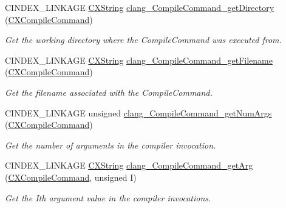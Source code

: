 \begin{DoxyCompactItemize}
\mbox{\label{group__COMPILATIONDB_gaa9bf6d3d4d19b8e32efc58cdc0fe53ad}} 
C\+I\+N\+D\+E\+X\+\_\+\+L\+I\+N\+K\+A\+GE \mbox{\hyperlink{structCXString}{C\+X\+String}} \mbox{\hyperlink{group__COMPILATIONDB_gaa9bf6d3d4d19b8e32efc58cdc0fe53ad}{clang\+\_\+\+Compile\+Command\+\_\+get\+Directory}} (\mbox{\hyperlink{group__COMPILATIONDB_gae59272595ab7fa4c1ed03348c56264bf}{C\+X\+Compile\+Command}})
\begin{DoxyCompactList}\small\item\em Get the working directory where the Compile\+Command was executed from. \end{DoxyCompactList}\item 
\mbox{\label{group__COMPILATIONDB_gaea64448378c6174e7896a81d26ff454a}} 
C\+I\+N\+D\+E\+X\+\_\+\+L\+I\+N\+K\+A\+GE \mbox{\hyperlink{structCXString}{C\+X\+String}} \mbox{\hyperlink{group__COMPILATIONDB_gaea64448378c6174e7896a81d26ff454a}{clang\+\_\+\+Compile\+Command\+\_\+get\+Filename}} (\mbox{\hyperlink{group__COMPILATIONDB_gae59272595ab7fa4c1ed03348c56264bf}{C\+X\+Compile\+Command}})
\begin{DoxyCompactList}\small\item\em Get the filename associated with the Compile\+Command. \end{DoxyCompactList}\item 
\mbox{\label{group__COMPILATIONDB_gaebda187f1c1807c3f612df26b20c12b2}} 
C\+I\+N\+D\+E\+X\+\_\+\+L\+I\+N\+K\+A\+GE unsigned \mbox{\hyperlink{group__COMPILATIONDB_gaebda187f1c1807c3f612df26b20c12b2}{clang\+\_\+\+Compile\+Command\+\_\+get\+Num\+Args}} (\mbox{\hyperlink{group__COMPILATIONDB_gae59272595ab7fa4c1ed03348c56264bf}{C\+X\+Compile\+Command}})
\begin{DoxyCompactList}\small\item\em Get the number of arguments in the compiler invocation. \end{DoxyCompactList}\item 
C\+I\+N\+D\+E\+X\+\_\+\+L\+I\+N\+K\+A\+GE \mbox{\hyperlink{structCXString}{C\+X\+String}} \mbox{\hyperlink{group__COMPILATIONDB_ga6b19abe9ced14c29cd6720b93b19194b}{clang\+\_\+\+Compile\+Command\+\_\+get\+Arg}} (\mbox{\hyperlink{group__COMPILATIONDB_gae59272595ab7fa4c1ed03348c56264bf}{C\+X\+Compile\+Command}}, unsigned I)
\begin{DoxyCompactList}\small\item\em Get the I\textquotesingle{}th argument value in the compiler invocations. \end{DoxyCompactList}\item 

\end{DoxyCompactItemize}
